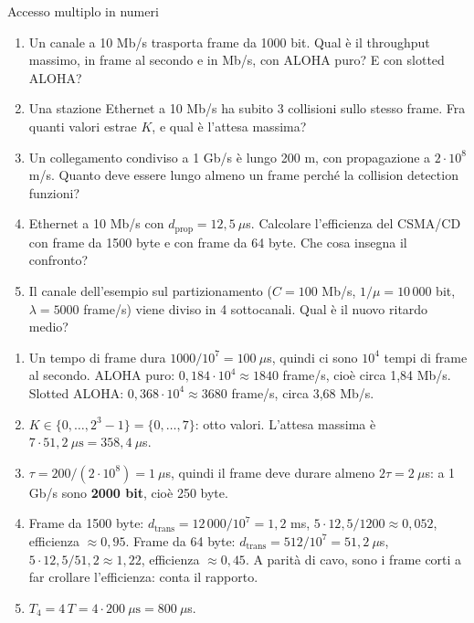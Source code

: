\begin{esercizio}{Accesso multiplo in numeri}
\begin{enumerate}[label=(\alph*)]
    \item Un canale a 10 Mb/s trasporta frame da 1000 bit. Qual è il throughput massimo, in frame al secondo e in Mb/s, con
          ALOHA puro? E con slotted ALOHA?
    \item Una stazione Ethernet a 10 Mb/s ha subito 3 collisioni sullo stesso frame. Fra quanti valori estrae $K$, e qual è l'attesa
          massima?
    \item Un collegamento condiviso a 1 Gb/s è lungo 200 m, con propagazione a $2 \cdot 10^8$ m/s. Quanto deve essere lungo almeno un
          frame perché la collision detection funzioni?
    \item Ethernet a 10 Mb/s con $d_{\text{prop}} = 12{,}5\ \mu$s. Calcolare l'efficienza del CSMA/CD con frame da 1500 byte e con frame da
          64 byte. Che cosa insegna il confronto?
    \item Il canale dell'esempio sul partizionamento ($C = 100$ Mb/s, $1/\mu = 10\,000$ bit, $\lambda = 5000$ frame/s) viene diviso in 4
          sottocanali. Qual è il nuovo ritardo medio?
\end{enumerate}

\svolgimento
\begin{enumerate}[label=(\alph*)]
    \item Un tempo di frame dura $1000/10^7 = 100\ \mu$s, quindi ci sono $10^4$ tempi di frame al secondo. ALOHA puro:
          $0{,}184 \cdot 10^4 \approx 1840$ frame/s, cioè circa 1,84 Mb/s. Slotted ALOHA: $0{,}368 \cdot 10^4 \approx 3680$ frame/s, circa
          3,68 Mb/s.
    \item $K \in \{0, \dots, 2^3 - 1\} = \{0, \dots, 7\}$: otto valori. L'attesa massima è $7 \cdot 51{,}2\ \mu\text{s} = 358{,}4\ \mu$s.
    \item $\tau = 200 / (2 \cdot 10^8) = 1\ \mu$s, quindi il frame deve durare almeno $2\tau = 2\ \mu$s: a 1 Gb/s sono
          \textbf{2000 bit}, cioè 250 byte.
    \item Frame da 1500 byte: $d_{\text{trans}} = 12\,000 / 10^7 = 1{,}2$ ms, $5 \cdot 12{,}5 / 1200 \approx 0{,}052$, efficienza
          $\approx 0{,}95$. Frame da 64 byte: $d_{\text{trans}} = 512 / 10^7 = 51{,}2\ \mu$s, $5 \cdot 12{,}5/51{,}2 \approx 1{,}22$,
          efficienza $\approx 0{,}45$. A parità di cavo, sono i frame corti a far crollare l'efficienza: conta il rapporto.
    \item $T_4 = 4\,T = 4 \cdot 200\ \mu\text{s} = 800\ \mu$s.
\end{enumerate}
\end{esercizio}


